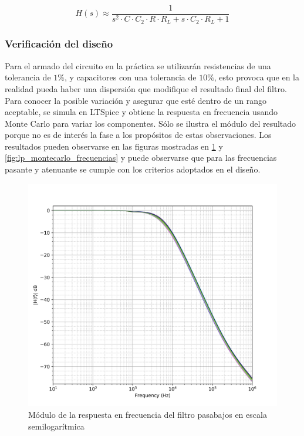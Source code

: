 \begin{equation}
    H(s) \approx \frac{1}{s^{2} \cdot C \cdot C_2 \cdot R \cdot R_L + s \cdot C_2 \cdot R_L + 1}
\end{equation}

\subsubsection{Verificaci\'on del dise\~no}
Para el armado del circuito en la pr\'actica se utilizar\'an resistencias de una tolerancia de $1\%$, y capacitores con una tolerancia de $10\%$, esto provoca que en la realidad
pueda haber una dispersi\'on que modifique el resultado final del filtro. Para conocer la posible variaci\'on y asegurar que est\'e dentro de un rango aceptable, se simula en LTSpice
y obtiene la respuesta en frecuencia usando Monte Carlo para variar los componentes. S\'olo se ilustra el m\'odulo del resultado porque no es de inter\'es la fase a los prop\'ositos de estas observaciones. 
Los resultados pueden observarse en las figuras mostradas en \ref{fig:lp_montecarlo} y \ref{fig:lp_montecarlo_frecuencias} y puede observarse que para las frecuencias pasante y atenuante se cumple con los criterios
adoptados en el dise\~no.

\begin{figure}[H]
    \centering
    \includegraphics[scale=0.12]{../EJ2/Recursos/lp_montecarlo.png}
    \caption{M\'odulo de la respuesta en frecuencia del filtro pasabajos en escala semilogar\'itmica}
    \label{fig:lp_montecarlo}
\end{figure}

